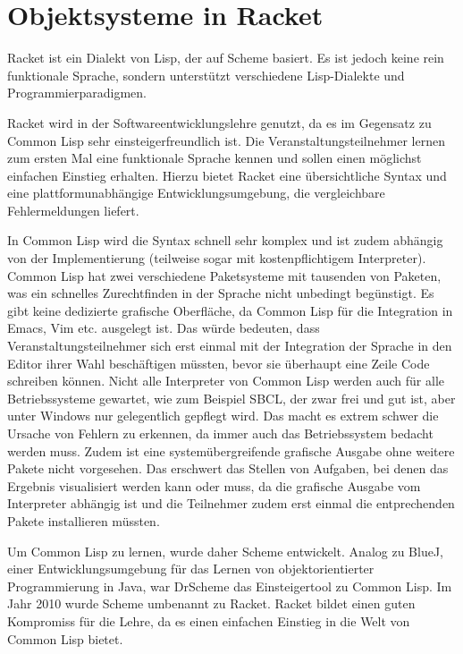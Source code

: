 \chapter{Objektsysteme in Racket}
Racket ist ein Dialekt von Lisp, der auf Scheme basiert\cite{racketguide-dialects}. Es ist jedoch keine rein funktionale Sprache, sondern unterstützt verschiedene Lisp-Dialekte und  Programmierparadigmen. 

Racket wird in der Softwareentwicklungslehre genutzt, da es im Gegensatz zu Common Lisp sehr einsteigerfreundlich ist. Die Veranstaltungsteilnehmer lernen zum ersten Mal eine funktionale Sprache kennen und sollen einen möglichst einfachen Einstieg erhalten. Hierzu bietet Racket eine übersichtliche Syntax und eine plattformunabhängige Entwicklungsumgebung, die vergleichbare Fehlermeldungen liefert.

In Common Lisp wird die Syntax schnell sehr komplex und ist zudem abhängig von der Implementierung (teilweise sogar mit kostenpflichtigem Interpreter). Common Lisp hat zwei verschiedene Paketsysteme mit tausenden von Paketen, was ein schnelles Zurechtfinden in der Sprache nicht unbedingt begünstigt. Es gibt keine dedizierte grafische Oberfläche, da Common Lisp für die Integration in Emacs, Vim etc. ausgelegt ist. Das würde bedeuten, dass Veranstaltungsteilnehmer sich erst einmal mit der Integration der Sprache in den Editor ihrer Wahl beschäftigen müssten, bevor sie überhaupt eine Zeile Code schreiben können. Nicht alle Interpreter von Common Lisp werden auch für alle Betriebssysteme gewartet, wie zum Beispiel SBCL, der zwar frei und gut ist, aber unter Windows nur gelegentlich gepflegt wird. Das macht es extrem schwer die Ursache von Fehlern zu erkennen, da immer auch das Betriebssystem bedacht werden muss. Zudem ist eine systemübergreifende grafische Ausgabe ohne weitere Pakete nicht vorgesehen. Das erschwert das Stellen von Aufgaben, bei denen das Ergebnis visualisiert werden kann oder muss, da die grafische Ausgabe vom Interpreter abhängig ist und die Teilnehmer zudem erst einmal die entprechenden Pakete installieren müssten. 

Um Common Lisp zu lernen, wurde daher Scheme entwickelt. Analog zu BlueJ, einer Entwicklungsumgebung für das Lernen von objektorientierter Programmierung in Java, war DrScheme das Einsteigertool zu Common Lisp. Im Jahr 2010 wurde Scheme umbenannt zu Racket. Racket bildet einen guten Kompromiss für die Lehre, da es einen einfachen Einstieg in die Welt von Common Lisp bietet.

